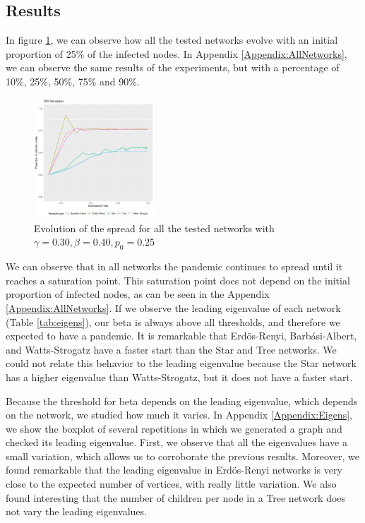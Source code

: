 \subsection{Results}
In figure \ref{fig:all_networks}, we can observe how all the tested networks evolve with an initial proportion of 25\% of the infected nodes. In Appendix \ref{Appendix:AllNetworks}, we can observe the same results of the experiments, but with a percentage of 10\%, 25\%, 50\%, 75\% and 90\%.

\begin{figure}
    \centering
    \includegraphics[width=0.4\textwidth]{img/AllNetworks_0.25.pdf}
    \caption{Evolution of the spread for all the tested networks with $\gamma = 0.30, \beta = 0.40, p_0=0.25$}
    \label{fig:all_networks}
\end{figure}

We can observe that in all networks the pandemic continues to spread until it reaches a saturation point. This saturation point does not depend on the initial proportion of infected nodes, as can be seen in the Appendix \ref{Appendix:AllNetworks}. If we observe the leading eigenvalue of each network (Table \ref{tab:eigens}), our beta is always above all thresholds, and therefore we expected to have a pandemic. It is remarkable that Erdös-Renyi, Barbási-Albert, and Watts-Strogatz have a faster start than the Star and Tree networks. We could not relate this behavior to the leading eigenvalue because the Star network has a higher eigenvalue than Watts-Strogatz, but it does not have a faster start. 



Because the threshold for beta depends on the leading eigenvalue, which depends on the network, we studied how much it varies. In Appendix \ref{Appendix:Eigens}, we show the boxplot of several repetitions in which we generated a graph and checked its leading eigenvalue. First, we observe that all the eigenvalues have a small variation, which allows us to corroborate the previous results. Moreover, we found remarkable that the leading eigenvalue in Erdös-Renyi networks is very close to the expected number of vertices, with really little variation. We also found interesting that the number of children per node in a Tree network does not vary the leading eigenvalues.